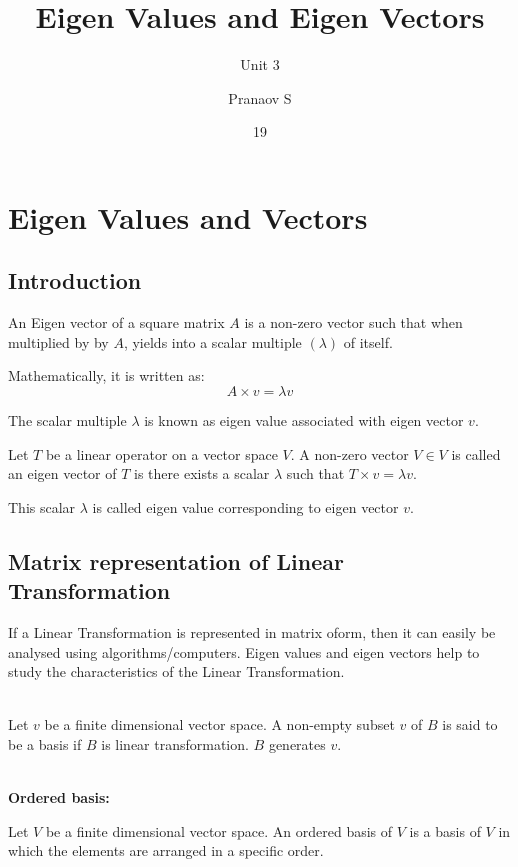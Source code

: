 \documentclass[english,course,fleqn]{lecture}
\title{Eigen Values and Eigen Vectors}
\subtitle{Unit 3}
\author{Pranaov S}
\date{19}{10}{2024}
\begin{document}
\newpage

\section{Eigen Values and Vectors}

\subsection{Introduction}

\begin{definition}
  An Eigen vector of a square matrix $A$ is a non-zero vector such that when multiplied by by $A$,
  yields into a scalar multiple $(\lambda)$ of itself.

  Mathematically, it is written as:
  \[
    A \times v = \lambda v
  \]

  The scalar multiple $\lambda$ is known as eigen value associated with eigen vector $v$.
\end{definition}

\begin{definition}
  Let $T$ be a linear operator on a vector space $V$.
  A non-zero vector $V \in V$ is called an eigen vector of $T$ is there exists a scalar $\lambda$ such that $T \times v = \lambda v$.

  This scalar $\lambda$ is called eigen value corresponding to eigen vector $v$.
\end{definition}

\subsection{Matrix representation of Linear Transformation}

If a Linear Transformation is represented in matrix oform, then it can easily be analysed using algorithms/computers.
Eigen values and eigen vectors help to study the characteristics of the Linear Transformation.

\\

Let $v$ be a finite dimensional vector space.
A non-empty subset $v$ of $B$ is said to be a basis if $B$ is linear transformation.
$B$ generates $v$.

\\

\textbf{Ordered basis:}

Let $V$ be a finite dimensional vector space.
An ordered basis of $V$ is a basis of $V$ in which the elements are arranged in a specific order.
\end{document}
